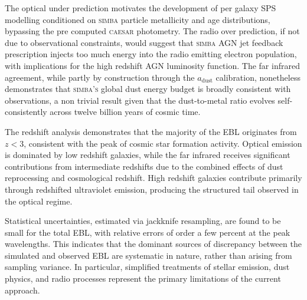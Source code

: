 \documentclass[
    a4paper, %
    10pt, %
    unnumberedsections, %
]{LTJournalArticle}
\begin{document}
The optical under prediction motivates the development of per galaxy SPS modelling conditioned on \textsc{simba} particle metallicity and age distributions, bypassing the pre computed \textsc{caesar} photometry. The radio over prediction, if not due to observational constraints, would suggest that \textsc{simba} AGN jet feedback prescription injects too much energy into the radio emitting electron population, with implications for the high redshift AGN luminosity function. The far infrared agreement, while partly by construction through the $a_{\mathrm{dust}}$ calibration, nonetheless demonstrates that \textsc{simba's} global dust energy budget is broadly consistent with observations, a non trivial result given that the dust-to-metal ratio evolves self-consistently across twelve billion years of cosmic time.


The redshift analysis demonstrates that the majority of the EBL originates from $z < 3$, consistent with the peak of cosmic star formation activity. Optical emission is dominated by low redshift galaxies, while the far infrared receives significant contributions from intermediate redshifts due to the combined effects of dust reprocessing and cosmological redshift. High redshift galaxies contribute primarily through redshifted ultraviolet emission, producing the structured tail observed in the optical regime.

Statistical uncertainties, estimated via jackknife resampling, are found to be small for the total EBL, with relative errors of order a few percent at the peak wavelengths. This indicates that the dominant sources of discrepancy between the simulated and observed EBL are systematic in nature, rather than arising from sampling variance. In particular, simplified treatments of stellar emission, dust physics, and radio processes represent the primary limitations of the current approach.
\end{document}
